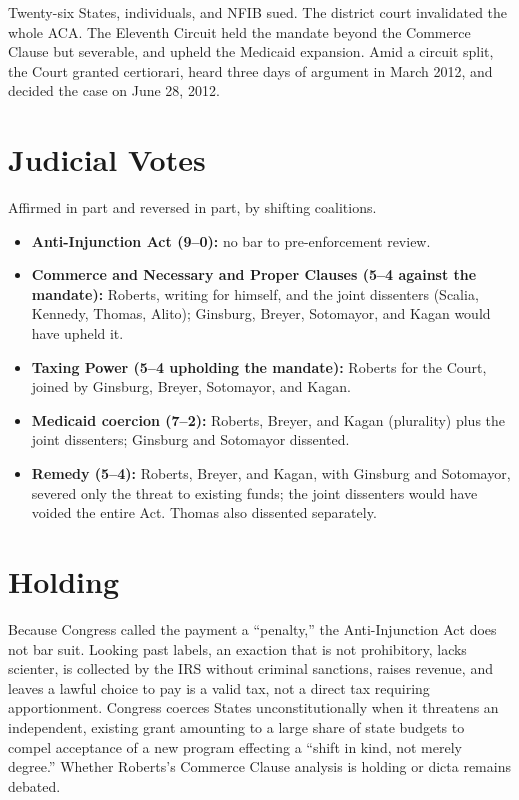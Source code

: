 \documentclass[12pt]{article}
\begin{document}
Twenty-six States, individuals, and NFIB sued. The district court invalidated the whole ACA. The Eleventh Circuit held the mandate beyond the Commerce Clause but severable, and upheld the Medicaid expansion. Amid a circuit split, the Court granted certiorari, heard three days of argument in March 2012, and decided the case on June 28, 2012.

\section{Judicial Votes}

Affirmed in part and reversed in part, by shifting coalitions.
\begin{itemize}
\item \textbf{Anti-Injunction Act (9--0):} no bar to pre-enforcement review.
\item \textbf{Commerce and Necessary and Proper Clauses (5--4 against the mandate):} Roberts, writing for himself, and the joint dissenters (Scalia, Kennedy, Thomas, Alito); Ginsburg, Breyer, Sotomayor, and Kagan would have upheld it.
\item \textbf{Taxing Power (5--4 upholding the mandate):} Roberts for the Court, joined by Ginsburg, Breyer, Sotomayor, and Kagan.
\item \textbf{Medicaid coercion (7--2):} Roberts, Breyer, and Kagan (plurality) plus the joint dissenters; Ginsburg and Sotomayor dissented.
\item \textbf{Remedy (5--4):} Roberts, Breyer, and Kagan, with Ginsburg and Sotomayor, severed only the threat to existing funds; the joint dissenters would have voided the entire Act. Thomas also dissented separately.
\end{itemize}

\section{Holding}

Because Congress called the payment a ``penalty,'' the Anti-Injunction Act does not bar suit. Looking past labels, an exaction that is not prohibitory, lacks scienter, is collected by the IRS without criminal sanctions, raises revenue, and leaves a lawful choice to pay is a valid tax, not a direct tax requiring apportionment. Congress coerces States unconstitutionally when it threatens an independent, existing grant amounting to a large share of state budgets to compel acceptance of a new program effecting a ``shift in kind, not merely degree.'' Whether Roberts's Commerce Clause analysis is holding or dicta remains debated.
\end{document}
